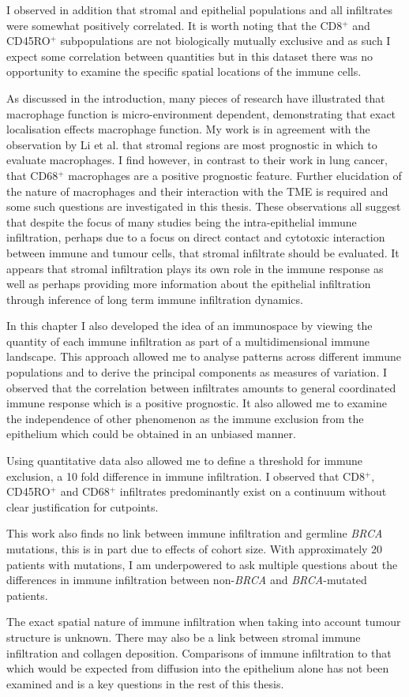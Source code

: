  I observed in addition that stromal and epithelial populations and all infiltrates were somewhat positively correlated. It is worth noting that the  CD8$^+$ and  CD45RO$^+$ subpopulations are not biologically mutually exclusive and as such I expect some correlation between quantities but in this dataset there was no opportunity to examine the specific spatial locations of the immune cells. 

As discussed in the introduction, many pieces of research have illustrated that macrophage function is micro-environment dependent\cite{ZhangMacrophage2014, li2018intratumoral}, demonstrating that exact localisation effects macrophage function. My work is in agreement with the observation by Li et al. that stromal regions are most prognostic in which to evaluate macrophages. I find however, in contrast to their work in lung cancer, that CD68$^+$ macrophages are a positive prognostic feature. Further elucidation of the nature of macrophages and their interaction with the TME is required and some such questions are investigated in this thesis.
These observations all suggest that despite the focus of many studies being the intra-epithelial immune infiltration, perhaps due to a focus on direct contact and cytotoxic interaction between immune and tumour cells, that stromal infiltrate should be evaluated. It appears that stromal infiltration plays its own role in the immune response as well as perhaps providing more information about the epithelial infiltration through inference of long term immune infiltration dynamics.

In this chapter I also developed the idea of an immunospace by viewing the quantity of each immune infiltration as part of a multidimensional immune landscape. This approach allowed me to analyse patterns across different immune populations and to derive the principal components as measures of variation. I observed that the correlation between infiltrates amounts to general coordinated immune response which is a positive prognostic. It also allowed me to examine the independence of other phenomenon as the immune exclusion from the epithelium which could be obtained in an unbiased manner.

Using quantitative data also allowed me to define a threshold for immune exclusion, a 10 fold difference in immune infiltration. I observed that CD8$^+$,  CD45RO$^+$ and  CD68$^+$  infiltrates predominantly exist on a continuum without clear justification for cutpoints.

This work also finds no link between immune infiltration and germline \textit{BRCA} mutations, this is in part due to effects of cohort size. With approximately 20 patients with mutations, I am underpowered to ask multiple questions about the differences in immune infiltration between non-\textit{BRCA} and \textit{BRCA}-mutated patients.

The exact spatial nature of immune infiltration when taking into account tumour structure is unknown. There may also be a link between stromal immune infiltration and collagen deposition. Comparisons of immune infiltration to that which would be expected from diffusion into the epithelium alone has not been examined and is a key questions in the rest of this thesis.

